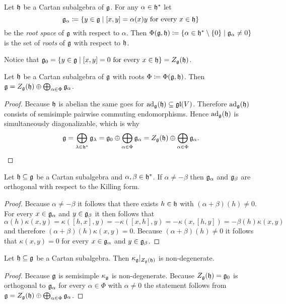\begin{defi}
 Let $\mathfrak{h}$ be a Cartan subalgebra of $\mathfrak{g}$. For any $\alpha \in \mathfrak{h}^*$ let
 \[
  \mathfrak{g}_\alpha \coloneqq \{y \in \mathfrak{g} \mid \text{$[x,y] = \alpha(x)y$ for every $x \in \mathfrak{h}$}\}
 \]
 be the \emph{root space} of $\mathfrak{g}$ with respect to $\alpha$. Then $\Phi(\mathfrak{g}, \mathfrak{h}) \coloneqq \{\alpha \in \mathfrak{h}^* \setminus \{0\} \mid \mathfrak{g}_\alpha \neq 0\}$ is the set of \emph{roots} of $\mathfrak{g}$ with respect to $\mathfrak{h}$.
\end{defi}


\begin{rem}
 Notice that $\mathfrak{g}_0 = \{y \in \mathfrak{g} \mid \text{$[x,y] = 0$ for every $x \in \mathfrak{h}$}\} = Z_{\mathfrak{g}}(\mathfrak{h})$.
\end{rem}



\begin{lem}
 Let $\mathfrak{h}$ be a Cartan subalgebra of $\mathfrak{g}$ with roots $\Phi \coloneqq \Phi(\mathfrak{g}, \mathfrak{h})$. Then $\mathfrak{g} = Z_{\mathfrak{g}}(\mathfrak{h}) \oplus \bigoplus_{\alpha \in \Phi} \mathfrak{g}_\alpha$.
\end{lem}
\begin{proof}
 Because $\mathfrak{h}$ is abelian the same goes for $\operatorname{ad}_{\mathfrak{g}}(\mathfrak{h}) \subseteq \mathfrak{gl}(V)$. Therefore $\operatorname{ad}_{\mathfrak{g}}(\mathfrak{h})$ consists of semisimple pairwise commuting endomorphisms. Hence $\operatorname{ad}_{\mathfrak{g}}(\mathfrak{h})$ is simultaneously diagonalizable, which is why
 \[
  \mathfrak{g}
  = \bigoplus_{\lambda \in \mathfrak{h}^*} \mathfrak{g}_\lambda
  = \mathfrak{g}_0 \oplus \bigoplus_{\alpha \in \Phi} \mathfrak{g}_\alpha
  = Z_{\mathfrak{g}}(\mathfrak{h}) \oplus \bigoplus_{\alpha \in \Phi} \mathfrak{g}_\alpha.
  \qedhere
 \]
\end{proof}




\begin{lem}
Let $\mathfrak{h} \subseteq \mathfrak{g}$ be a Cartan subalgebra and $\alpha, \beta \in \mathfrak{h}^*$. If $\alpha \neq -\beta$ then $\mathfrak{g}_\alpha$ and $\mathfrak{g}_\beta$ are orthogonal with respect to the Killing form.
\end{lem}
\begin{proof}
 Because $\alpha \neq -\beta$ it follows that there exists $h \in \mathfrak{h}$ with $(\alpha+\beta)(h) \neq 0$. For every $x \in \mathfrak{g}_\alpha$ and $y \in \mathfrak{g}_\beta$ it then follows that
 \[
  \alpha(h) \kappa(x,y)
  = \kappa([h,x],y)
  = -\kappa([x,h],y)
  = -\kappa(x,[h,y])
  = -\beta(h)\kappa(x,y)
 \]
 and therefore $(\alpha+\beta)(h)\kappa(x,y) = 0$. Because $(\alpha+\beta)(h) \neq 0$ it follows that $\kappa(x,y) = 0$ for every $x \in \mathfrak{g}_\alpha$ and $y \in \mathfrak{g}_\beta$.
\end{proof}


\begin{cor}
 Let $\mathfrak{h} \subseteq \mathfrak{g}$ be a Cartan subalgebra. Then $\kappa_{\mathfrak{g}}|_{Z_{\mathfrak{g}}(\mathfrak{h})}$ is non-degenerate.
\end{cor}
\begin{proof}
 Because $\mathfrak{g}$ is semisimple $\kappa_{\mathfrak{g}}$ is non-degenerate. Because $Z_{\mathfrak{g}}(\mathfrak{h}) = \mathfrak{g}_0$ is orthogonal to $\mathfrak{g}_\alpha$ for every $\alpha \in \Phi$ with $\alpha \neq 0$ the statement follows from $\mathfrak{g} = Z_{\mathfrak{g}}(\mathfrak{h}) \oplus \bigoplus_{\alpha \in \Phi} \mathfrak{g}_\alpha$.
\end{proof}






